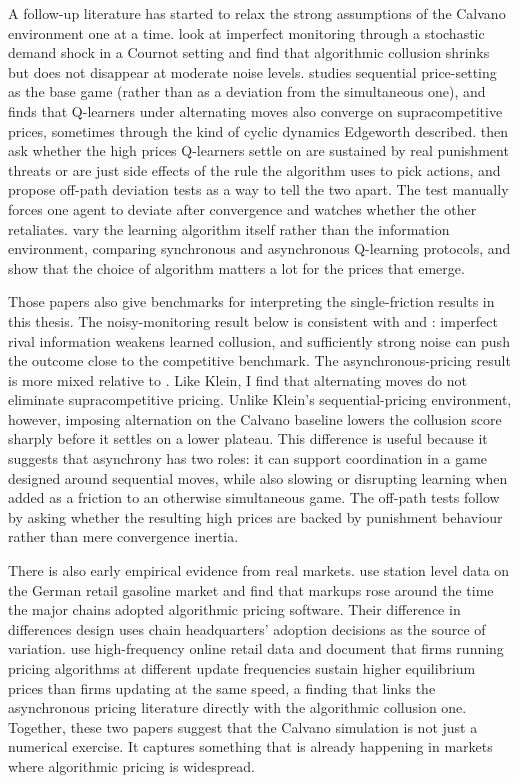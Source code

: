 A follow-up literature has started to relax the strong assumptions of the Calvano environment one at a time. \citet{calvano2021} look at imperfect monitoring through a stochastic demand shock in a Cournot setting and find that algorithmic collusion shrinks but does not disappear at moderate noise levels. \citet{klein2021} studies sequential price-setting as the base game (rather than as a deviation from the simultaneous one), and finds that Q-learners under alternating moves also converge on supracompetitive prices, sometimes through the kind of cyclic dynamics Edgeworth described. \citet{calvano2023} then ask whether the high prices Q-learners settle on are sustained by real punishment threats or are just side effects of the rule the algorithm uses to pick actions, and propose off-path deviation tests as a way to tell the two apart. The test manually forces one agent to deviate after convergence and watches whether the other retaliates. \citet{asker2024} vary the learning algorithm itself rather than the information environment, comparing synchronous and asynchronous Q-learning protocols, and show that the choice of algorithm matters a lot for the prices that emerge.

Those papers also give benchmarks for interpreting the single-friction results in this thesis. The noisy-monitoring result below is consistent with \citet{calvano2021} and \citet{zhang2025}: imperfect rival information weakens learned collusion, and sufficiently strong noise can push the outcome close to the competitive benchmark. The asynchronous-pricing result is more mixed relative to \citet{klein2021}. Like Klein, I find that alternating moves do not eliminate supracompetitive pricing. Unlike Klein's sequential-pricing environment, however, imposing alternation on the Calvano baseline lowers the collusion score sharply before it settles on a lower plateau. This difference is useful because it suggests that asynchrony has two roles: it can support coordination in a game designed around sequential moves, while also slowing or disrupting learning when added as a friction to an otherwise simultaneous game. The off-path tests follow \citet{calvano2023} by asking whether the resulting high prices are backed by punishment behaviour rather than mere convergence inertia.

There is also early empirical evidence from real markets. \citet{assad2024} use station level data on the German retail gasoline market and find that markups rose around the time the major chains adopted algorithmic pricing software. Their difference in differences design uses chain headquarters' adoption decisions as the source of variation. \citet{brown2023} use high-frequency online retail data and document that firms running pricing algorithms at different update frequencies sustain higher equilibrium prices than firms updating at the same speed, a finding that links the asynchronous pricing literature directly with the algorithmic collusion one. Together, these two papers suggest that the Calvano simulation is not just a numerical exercise. It captures something that is already happening in markets where algorithmic pricing is widespread.

